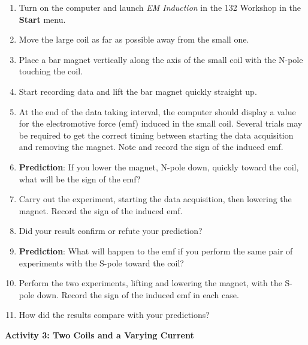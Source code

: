 \begin{enumerate}
\item Turn on the computer and launch {\it EM Induction} in the 132 Workshop in the {\bf Start} menu.
\item Move the large coil as far as possible away from the small one.
\item Place a bar magnet vertically along the axis of the small coil with
the N-pole touching the coil.
\item Start recording data and lift the bar magnet quickly straight up.
\item At the end of the data taking interval, the computer should display
a value for the electromotive force (emf) induced in the small coil.
Several trials may be required to get the correct timing between starting
the data acquisition and removing the magnet. Note and record the sign of the induced
emf.\vspace{10mm}

\item \textbf{Prediction}: If you lower the magnet, N-pole down, quickly
toward the coil, what will be the sign of the emf? \vspace{15mm}

\item Carry out the experiment, starting the data acquisition, then lowering the magnet.
Record the sign of the induced emf.\vspace{10mm}

\item Did your result confirm or refute your prediction?\vspace{15mm}

\item \textbf{Prediction}: What will happen to the emf if you perform the
same pair of experiments with the S-pole toward the coil? \vspace{15mm}

\item Perform the two experiments, lifting and lowering the magnet, with
the S-pole down. Record the sign of the induced emf in each case.\vspace{10mm}

\item How did the results compare with your predictions?\vspace{15mm}

\end{enumerate}
\textbf{Activity 3: Two Coils and a Varying Current}

